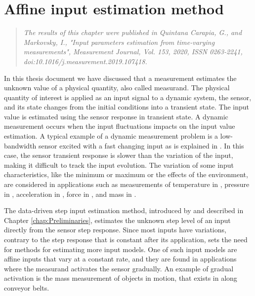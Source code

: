\glsresetall

\chapter{Affine input estimation method}\label{chap:AffineInput}


\begin{quote}
\emph{The results of this chapter were published in Quintana Carapia, G., and Markovsky, I.,
"Input parameters estimation from time-varying measurements", Measurement Journal, Vol. 153, 2020,
ISSN 0263-2241, doi:10.1016/j.measurement.2019.107418. \nocite{QuintanaMEAS} } %
\end{quote}

\vfill{}


\color{blue} 
In this thesis document we have discussed that a measurement estimates the unknown value of a physical quantity, also called measurand.
The physical quantity of interest is applied as an input signal to a dynamic system, the sensor, and its state changes from the initial conditions into a transient state.
The input value is estimated using the sensor response in transient state.
A dynamic measurement occurs when the input fluctuations impacts on the input value estimation.
A typical example of a dynamic measurement problem is a low-bandwidth sensor excited with a fast changing input as is explained in \citet{Dienstfrey14}.
In this case, the sensor transient response is slower than the variation of the input, making it difficult to track the input evolution.
The variation of some input characteristics, like the minimum or maximum or the effects of the environment, are considered in applications such as measurements of temperature in \citet{Saggin01}, pressure in \citet{Matthews14}, acceleration in \citet{Link07}, force in \citet{Vlajic16, Hessling08a}, and mass in \cite{Shu93, Boschetti13}.

The data-driven step input estimation method, introduced by \citet{Markovsky15cep} and described in Chapter \ref{chap:Preliminaries},
estimates the unknown step level of an input directly from the sensor step response.
Since most inputs have variations, contrary to the step response that is constant after its application, sets the need for methods for estimating more input models.
One of such input models are affine inputs that vary at a constant rate, and they are found in applications where the measurand activates the sensor gradually. 
An example of gradual activation is the mass measurement of objects in motion, that exists in along conveyor belts.

